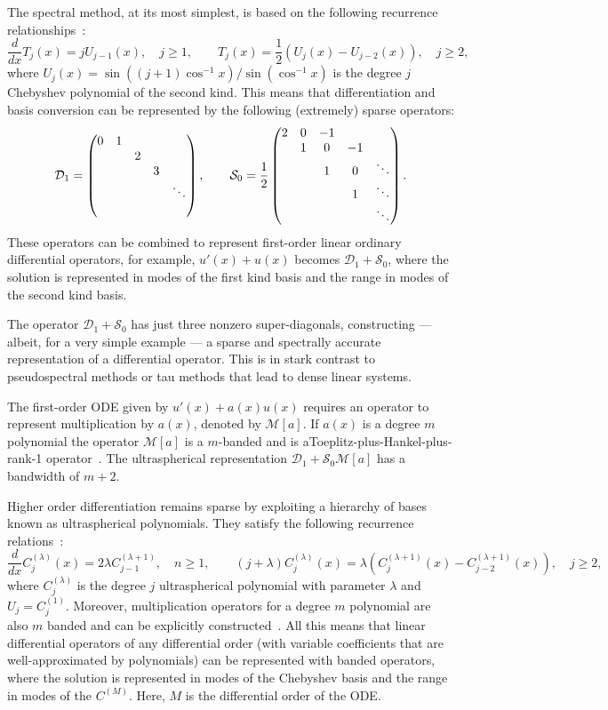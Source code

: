 \documentclass[review]{siamart171218}
\begin{document}
The spectral method, at its most simplest, is based on the following recurrence relationships~\cite[(18.9.21) \& (18.9.9)]{NISTHandbook}: 
\[
 \frac{d}{dx} T_j(x) = jU_{j-1}(x), \quad j\geq 1, \qquad T_j(x) = \frac{1}{2}\left(U_{j}(x)-U_{j-2}(x)\right), \quad j\geq 2,
\]
where $U_{j}(x) = \sin((j+1)\cos^{-1}x)/\sin(\cos^{-1}x)$ is the degree $j$ Chebyshev polynomial of the second kind. This means that differentiation and basis conversion can be represented by the following (extremely) sparse operators:
\[
 \mathcal{D}_1 = \begin{pmatrix}0 & 1 \cr &&2\cr &&&3\cr &&&&\ddots\cr & \end{pmatrix}, \qquad \mathcal{S}_0 = \frac{1}{2}\begin{pmatrix}2 & 0 &-1\cr & 1 & 0 & -1 \cr && 1 & 0 & \ddots\cr &&& 1 &\ddots\cr &&&&\ddots  \end{pmatrix}.  
\]
These operators can be combined to represent first-order linear ordinary differential operators, for example, $u'(x) + u(x)$ becomes $\mathcal{D}_1 + \mathcal{S}_0$, where the solution is represented in modes of the first kind basis and the range in modes of the second kind basis. 

The operator $\mathcal{D}_1 + \mathcal{S}_0$ has just three nonzero super-diagonals, constructing --- albeit, for a very simple example --- a sparse and spectrally accurate representation of a differential operator.  This is in stark contrast to pseudospectral methods or tau methods that lead to dense linear systems.  

The first-order ODE given by $u'(x)+a(x)u(x)$ requires an operator to represent multiplication by $a(x)$, denoted by $\mathcal{M}[a]$. If $a(x)$ is a degree $m$ polynomial the operator $\mathcal{M}[a]$ is a $m$-banded and is aToeplitz-plus-Hankel-plus-rank-1 operator~\cite{Olver_13_01}. The ultraspherical representation $\mathcal{D}_1 + \mathcal{S}_0\mathcal{M}[a]$ has a bandwidth of $m+2$. 

Higher order differentiation remains sparse by exploiting a hierarchy of bases known as ultraspherical polynomials. They satisfy the following recurrence relations~\cite[(18.9.19),(18.9.7)]{NISTHandbook}:
\[
 \frac{d}{dx}C_j^{(\lambda)}(x) = 2\lambda C_{j-1}^{(\lambda+1)},\quad n\geq 1, \qquad (j+\lambda)C_j^{(\lambda)}(x) = \lambda\left(C_{j}^{(\lambda+1)}(x) -C_{j-2}^{(\lambda+1)}(x)\right), \quad j\geq 2,
\]
where $C^{(\lambda)}_j$ is the degree $j$ ultraspherical polynomial with parameter $\lambda$ and $U_j = C^{(1)}_j$. Moreover, multiplication operators for a degree $m$ polynomial are also $m$ banded and can be explicitly constructed~\cite{Olver_13_01}. All this means that linear differential operators of any differential order (with variable coefficients that are well-approximated by polynomials) can be represented with banded operators, where the solution is represented in modes of the Chebyshev basis and the range in modes of the $C^{(M)}$. Here, $M$ is the differential order of the ODE. 
\end{document}
